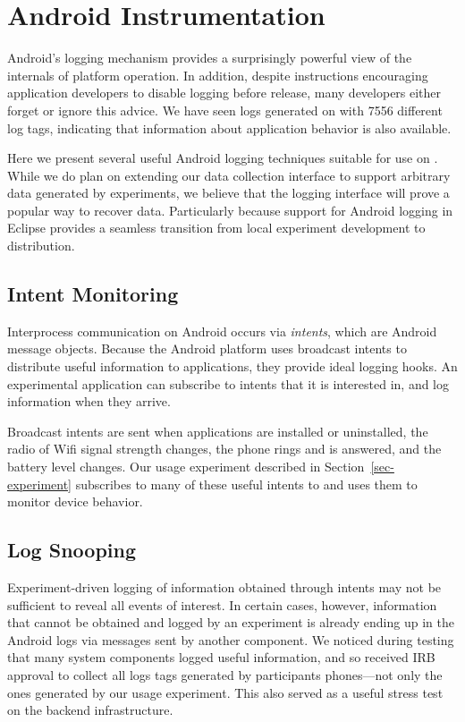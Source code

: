 \section{Android Instrumentation}
\label{sec-logging}



Android's logging mechanism provides a surprisingly powerful view of the
internals of platform operation. In addition, despite instructions
encouraging application developers to disable logging before release, many
developers either forget or ignore this advice. We have seen logs generated
on \PhoneLab{} with \num{7556} different log tags, indicating that
information about application behavior is also available.

Here we present several useful Android logging techniques suitable for use on
\PhoneLab{}. While we do plan on extending our data collection interface to
support arbitrary data generated by experiments, we believe that the logging
interface will prove a popular way to recover data. Particularly because
support for Android logging in Eclipse provides a seamless transition from
local experiment development to \PhoneLab{} distribution.

\subsection{Intent Monitoring}

Interprocess communication on Android occurs via \textit{intents}, which are
Android message objects. Because the Android platform uses broadcast intents
to distribute useful information to applications, they provide ideal logging
hooks. An experimental application can subscribe to intents that it is
interested in, and log information when they arrive.

Broadcast intents are sent when applications are installed or uninstalled,
the radio of Wifi signal strength changes, the phone rings and is answered,
and the battery level changes. Our usage experiment described in
Section~\ref{sec-experiment} subscribes to many of these useful intents to
and uses them to monitor device behavior.

\subsection{Log Snooping}

Experiment-driven logging of information obtained through intents may not be
sufficient to reveal all events of interest. In certain cases, however,
information that cannot be obtained and logged by an experiment is already
ending up in the Android logs via messages sent by another component. We
noticed during testing that many system components logged useful information,
and so received IRB approval to collect all logs tags generated by
participants phones---not only the ones generated by our usage experiment.
This also served as a useful stress test on the \PhoneLab{} backend
infrastructure.

